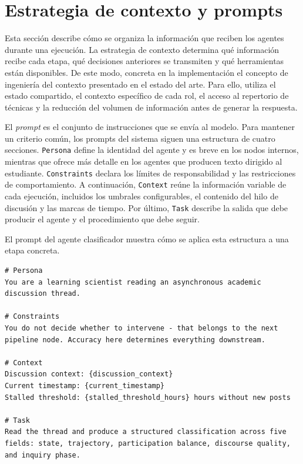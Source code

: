 \section{Estrategia de contexto y prompts}
\label{sec:prompts}

Esta sección describe cómo se organiza la información que reciben los agentes durante una ejecución. La estrategia de contexto determina qué información recibe cada etapa, qué decisiones anteriores se transmiten y qué herramientas están disponibles. De este modo, concreta en la implementación el concepto de ingeniería del contexto presentado en el estado del arte. Para ello, utiliza el estado compartido, el contexto específico de cada rol, el acceso al repertorio de técnicas y la reducción del volumen de información antes de generar la respuesta.

El \textit{prompt} es el conjunto de instrucciones que se envía al modelo. Para mantener un criterio común, los prompts del sistema siguen una estructura de cuatro secciones. \texttt{Persona} define la identidad del agente y es breve en los nodos internos, mientras que ofrece más detalle en los agentes que producen texto dirigido al estudiante. \texttt{Constraints} declara los límites de responsabilidad y las restricciones de comportamiento. A continuación, \texttt{Context} reúne la información variable de cada ejecución, incluidos los umbrales configurables, el contenido del hilo de discusión y las marcas de tiempo. Por último, \texttt{Task} describe la salida que debe producir el agente y el procedimiento que debe seguir.

El prompt del agente clasificador muestra cómo se aplica esta estructura a una etapa concreta.

\begin{small}
\begin{verbatim}
# Persona
You are a learning scientist reading an asynchronous academic
discussion thread.

# Constraints
You do not decide whether to intervene - that belongs to the next
pipeline node. Accuracy here determines everything downstream.

# Context
Discussion context: {discussion_context}
Current timestamp: {current_timestamp}
Stalled threshold: {stalled_threshold_hours} hours without new posts

# Task
Read the thread and produce a structured classification across five
fields: state, trajectory, participation balance, discourse quality,
and inquiry phase.
\end{verbatim}
\end{small}


